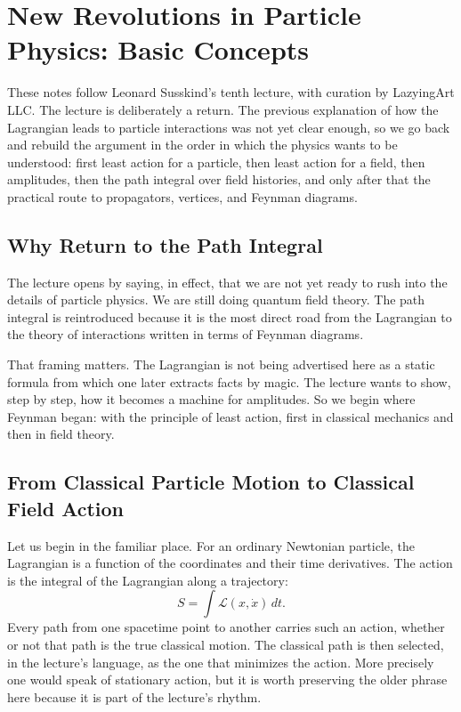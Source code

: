 \chapter{New Revolutions in Particle Physics: Basic Concepts}

These notes follow Leonard Susskind's tenth lecture, with curation by LazyingArt LLC. The lecture is deliberately a return. The previous explanation of how the Lagrangian leads to particle interactions was not yet clear enough, so we go back and rebuild the argument in the order in which the physics wants to be understood: first least action for a particle, then least action for a field, then amplitudes, then the path integral over field histories, and only after that the practical route to propagators, vertices, and Feynman diagrams.

\section{Why Return to the Path Integral}

The lecture opens by saying, in effect, that we are not yet ready to rush into the details of particle physics. We are still doing quantum field theory. The path integral is reintroduced because it is the most direct road from the Lagrangian to the theory of interactions written in terms of Feynman diagrams.

That framing matters. The Lagrangian is not being advertised here as a static formula from which one later extracts facts by magic. The lecture wants to show, step by step, how it becomes a machine for amplitudes. So we begin where Feynman began: with the principle of least action, first in classical mechanics and then in field theory.

\section{From Classical Particle Motion to Classical Field Action}

Let us begin in the familiar place. For an ordinary Newtonian particle, the Lagrangian is a function of the coordinates and their time derivatives. The action is the integral of the Lagrangian along a trajectory:
\begin{equation}
S=\int \mathcal{L}(x,\dot{x})\,dt.
\end{equation}
Every path from one spacetime point to another carries such an action, whether or not that path is the true classical motion. The classical path is then selected, in the lecture's language, as the one that minimizes the action. More precisely one would speak of stationary action, but it is worth preserving the older phrase here because it is part of the lecture's rhythm.

